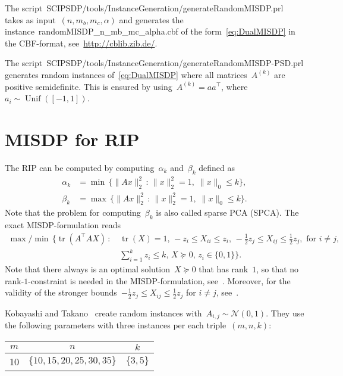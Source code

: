 \documentclass[11pt,a4paper]{article}
\newcommand{\norm}[1]{\lVert{#1}\rVert}
\newcommand{\suchthat}{\, : \,}
\newcommand{\T}{^\top}
\newcommand{\normal}{\mathcal{N}}
\DeclareMathOperator{\tr}{tr}
\DeclareMathOperator{\unif}{Unif}
\theoremstyle{definition}
\begin{document}
The
script~\textsf{SCIPSDP/tools/InstanceGeneration/generateRandomMISDP.prl}
takes as input~$(n,m_b,m_c,\alpha)$ and generates the
instance~\textsf{randomMISDP\_n\_mb\_mc\_alpha.cbf} of the
form~\eqref{eq:DualMISDP} in the CBF-format,
see~\url{http://cblib.zib.de/}.

The
script~\textsf{SCIPSDP/tools/InstanceGeneration/generateRandomMISDP-PSD.prl}
generates random instances of~\eqref{eq:DualMISDP} where all
matrices~$A^{(k)}$ are positive semidefinite. This is ensured by
using~$A^{(k)} = aa\T$, where~$a_i \sim \unif([-1,1])$.


\section{MISDP for RIP}
\label{sec:RandomRIP}

The RIP can be computed by computing~$\alpha_k$ and~$\beta_k$ defined as
\begin{align}
  \alpha_k &= \min\, \{\norm{Ax}_2^2 \suchthat \norm{x}_2^2 = 1, \;
             \norm{x}_0 \leq k\}, \label{eq:RIPalpha} \\
  \beta_k &=  \max\, \{\norm{Ax}_2^2 \suchthat \norm{x}_2^2 = 1, \;
             \norm{x}_0 \leq k\}. \label{eq:RIPbeta}
\end{align}
Note that the problem for computing~$\beta_k$ is also called sparse PCA (SPCA).
The exact MISDP-formulation reads
\begin{align}\label{eq:MISDPRIP}
  \max/\min\, \Big\{\tr(A\T AX) \suchthat
  &\tr(X) = 1, \, -z_i \leq X_{ii} \leq
  z_i,\, -\tfrac{1}{2}z_j \leq X_{ij} \leq \tfrac{1}{2}z_j, \text{ for } i
    \neq j, \\
  &\sum_{i=1}^k z_i\leq k,\, X \succeq 0,\, z_i \in \{0,1\}\Big\}.
\end{align}
Note that there always is an optimal solution~$X \succeq 0$ that has
rank~$1$, so that no rank-$1$-constraint is needed in the
MISDP-formulation, see~\cite[Theorem 4]{GalP16}. Moreover, for the
validity of the stronger bounds~$-\tfrac{1}{2}z_j \leq X_{ij} \leq
\tfrac{1}{2}z_j$ for $i \neq j$, see~\cite[Lemma 1]{GalP16}.

Kobayashi and Takano~\cite{Kob20} create random instances
with~$A_{i,j} \sim \normal(0,1)$. They use the following parameters with
three instances per each triple~$(m,n,k)$:
\begin{table}[h]
  \centering
  \begin{tabular}{ccc}
    $m$ & $n$ & $k$ \\
    \toprule
    10 & $\{10,15,20,25,30,35\}$ & $\{3,5\}$
  \end{tabular}
\end{table}
\end{document}
